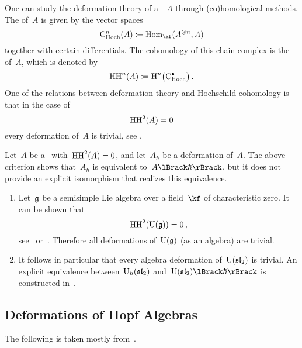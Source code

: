 \documentclass[a4paper, 11pt, oneside]{scrartcl}
\begin{document}
\begin{remark}
  One can study the deformation theory of a~\algebra{$\kf$}~$A$ through (co)homological methods.
  The  of~$A$ is given by the vector spaces
  \[
    \CHoch^n(A)
    \defined
    \Hom_{\kf}(A^{\tensor n}, A)
  \]
  together with certain differentials.
  The cohomology of this chain complex is the  of~$A$, which is denoted by
  \[
    \HH^n(A)
    \defined
    \Homology^n\bigl( \CHoch^\bullet \bigr) \,.
  \]
  One of the relations between deformation theory and Hochschild cohomology is that in the case of
  \[
    \operatorname{HH}^2(A) = 0
  \]
  every deformation of~$A$ is trivial, see \cite[Theorem~2]{gerstenhaber_quantum}.
\end{remark}

\begin{warning}
  Let~$A$ be a~\algebra{$\kf$} with~$\operatorname{HH}^2(A) = 0$, and let~$A_\hbar$ be a deformation of~$A$.
  The above criterion shows that~$A_\hbar$ is equivalent to~$\power{A}{\hbar}$, but it does not provide an explicit isomorphism that realizes this equivalence.
\end{warning}

\begin{example}
  \leavevmode
  \begin{enumerate}
    \item
      Let~$\mathfrak{g}$ be a semisimple Lie algebra over a field~$\kf$ of characteristic zero.
      It can be shown that
      \[
        \operatorname{HH}^2( \operatorname{U}(\mathfrak{g}) ) = 0 \,,
      \]
      see~\cite[Theorem~2]{gerstenhaber_quantum} or~\cite[Exercise~2.8.1,~Bonus]{schedler_nca}.
      Therefore all deformations of~$\operatorname{U}(\mathfrak{g})$ (as an algebra) are trivial.
    \item
      It follows in particular that every algebra deformation of~$\operatorname{U}(\mathfrak{sl}_2)$ is trivial.
      An explicit equivalence between~$\operatorname{U}_{\hbar}(\mathfrak{sl}_2)$ and~$\power{\Univ(\sllie_2)}{\hbar}$ is constructed in~\cite[Proposition~4.6.4]{guide_to_quantum_groups}.
  \end{enumerate}
\end{example}





\subsection{Deformations of Hopf Algebras}

The following is taken mostly from~\cite[Chapter~6]{guide_to_quantum_groups}.
\end{document}
